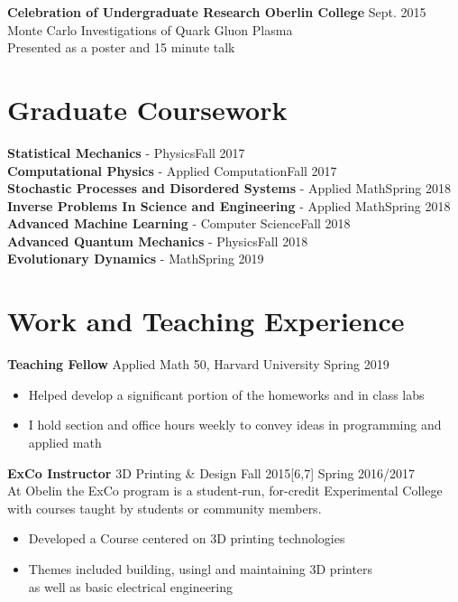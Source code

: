 \documentclass[margin]{res}
\begin{document}
\begin{resume}
{\bf Celebration of Undergraduate Research Oberlin College} \hfill Sept. 2015 \\
Monte Carlo Investigations of Quark Gluon Plasma\\
Presented as a poster and 15 minute talk

		\section{Graduate Coursework}

{\bf Statistical Mechanics} - Physics\hfill Fall  2017\\ 
{\bf Computational Physics} - Applied Computation\hfill Fall  2017\\ 
{\bf Stochastic Processes and Disordered Systems} - Applied Math\hfill Spring  2018\\ 
{\bf Inverse Problems In Science and Engineering} - Applied Math\hfill Spring  2018\\ 
{\bf Advanced Machine Learning} - Computer Science\hfill Fall  2018\\ 
{\bf Advanced Quantum Mechanics} - Physics\hfill Fall  2018\\ 
{\bf Evolutionary Dynamics} - Math\hfill Spring 2019\\ 





	
	\section{Work and Teaching Experience}
	{\bf Teaching Fellow} Applied Math 50, Harvard University \hfill Spring 2019
	\begin{itemize}
		\item Helped develop a significant portion of the homeworks and in class labs
		\item I hold section and office hours weekly to convey ideas in programming and applied math
	\end{itemize}
	{\bf ExCo Instructor} 3D Printing \& Design \hfill\small {Fall 2015[6,7] Spring 2016/2017}
	\normalsize\\
	At Obelin the ExCo program is a student-run, for-credit Experimental College with courses taught by students or community members.
	\begin{itemize} \itemsep -2pt  %
		\item Developed a Course centered on 3D printing technologies
		\item Themes included building, usingl and maintaining 3D printers\\ as well as basic electrical engineering
	\end{itemize}
	 

\end{resume}
\end{document}
